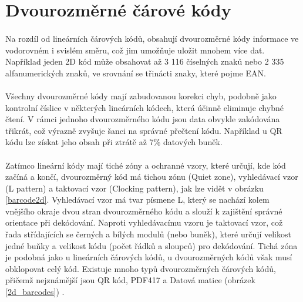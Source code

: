 \section{Dvourozměrné čárové kódy}
\paragraph{} Na rozdíl od lineárních čárových kódů, obsahují dvourozměrné kódy informace ve vodorovném i svislém směru, což jim umožňuje uložit mnohem více dat. Například jeden 2D kód může obsahovat až 3 116 číselných znaků nebo 2 335 alfanumerických znaků, ve srovnání se třinácti znaky, které pojme EAN.
\paragraph{}
Všechny dvourozměrné kódy mají zabudovanou korekci chyb, podobně jako kontrolní číslice v některých lineárních kódech, která účinně eliminuje chybné čtení. V rámci jednoho dvourozměrného kódu jsou data obvykle zakódována třikrát, což výrazně zvyšuje šanci na správné přečtení kódu. Například u QR kódu lze získat jeho obsah při ztrátě až 7\% datových buněk.
\paragraph{}
Zatímco lineární kódy mají tiché zóny a ochranné vzory, které určují, kde kód začíná a končí, dvourozměrný kód má tichou zónu (Quiet zone), vyhledávací vzor (L pattern) a taktovací vzor (Clocking pattern), jak lze vidět v obrázku \ref{barcode2d}. Vyhledávací vzor má tvar písmene L, který se nachází kolem vnějšího okraje dvou stran dvourozměrného kódu a slouží k zajištění správné orientace při dekódování. Naproti vyhledávacímu vzoru je taktovací vzor, což řada střídajících se černých a bílých modulů (nebo buněk), které určují velikost jedné buňky a velikost kódu (počet řádků a sloupců) pro dekódování. Tichá zóna je podobná jako u lineárních čárových kódů, u dvourozměrných kódů však musí obklopovat celý kód. Existuje mnoho typů dvourozměrných čárových kódů, přičemž nejznámější jsou QR kód, PDF417 a Datová matice (obrázek \ref{2d_barcodes}) \cite{barcode1}.

